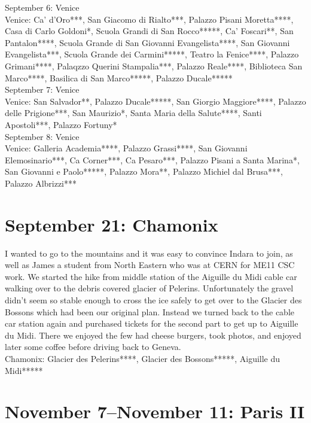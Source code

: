 September 6: Venice\\
Venice: Ca' d'Oro***, San Giacomo di Rialto***, Palazzo Pisani Moretta****, Casa di Carlo Goldoni*, Scuola Grandi di San Rocco*****, Ca' Foscari**, San Pantalon****, Scuola Grande di San Giovanni Evangelista****, San Giovanni Evangelista***, Scuola Grande dei Carmini*****, Teatro la Fenice****, Palazzo Grimani****, Palaqzzo Querini Stampalia***, Palazzo Reale****, Biblioteca San Marco****,  Basilica di San Marco*****, Palazzo Ducale*****\\

September 7: Venice\\
Venice: San Salvador**, Palazzo Ducale*****, San Giorgio Maggiore****, Palazzo delle Prigione***, San Maurizio*, Santa Maria della Salute****, Santi Apostoli***,  Palazzo Fortuny*\\

September 8: Venice\\
Venice: Galleria Academia****, Palazzo Grassi****, San Giovanni Elemosinario***, Ca Corner***, Ca Pesaro***, Palazzo Pisani a Santa Marina*, San Giovanni e Paolo*****, Palazzo Mora**, Palazzo Michiel dal Brusa***, Palazzo Albrizzi***

\section{September 21: Chamonix}
\label{Chamonix2013}

I wanted to go to the mountains and it was easy to convince Indara to join, as well as James a student from North Eastern who was at CERN for ME11 CSC work. We started the hike from middle station of the Aiguille du Midi cable car walking over to the debris covered glacier of Pelerins. Unfortunately the gravel didn't seem so stable enough to cross the ice safely to get over to the Glacier des Bossons which had been our original plan. Instead we turned back to the cable car station again and purchased tickets for the second part to get up to Aiguille du Midi. There we enjoyed the few had cheese burgers, took photos, and enjoyed later some coffee before driving back to Geneva.\\

Chamonix: Glacier des Pelerins****, Glacier des Bossons*****, Aiguille du Midi*****

\section{November 7--November 11: Paris II}
\label{2013ParisII}

